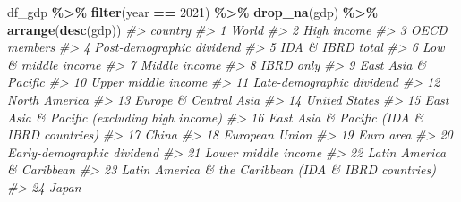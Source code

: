 \documentclass[
  xelatex, ja=standard]{bxjsbook}
\newenvironment{Shaded}{\begin{snugshade}}{\end{snugshade}}
\newcommand{\CommentTok}[1]{\textcolor[rgb]{0.56,0.35,0.01}{\textit{#1}}}
\newcommand{\DecValTok}[1]{\textcolor[rgb]{0.00,0.00,0.81}{#1}}
\newcommand{\FunctionTok}[1]{\textcolor[rgb]{0.13,0.29,0.53}{\textbf{#1}}}
\newcommand{\NormalTok}[1]{#1}
\newcommand{\SpecialCharTok}[1]{\textcolor[rgb]{0.81,0.36,0.00}{\textbf{#1}}}
\theoremstyle{definition}
\theoremstyle{definition}
\theoremstyle{definition}
\theoremstyle{definition}
\theoremstyle{remark}
\begin{document}
\begin{Shaded}
\begin{Highlighting}[]
\NormalTok{df\_gdp }\SpecialCharTok{\%\textgreater{}\%} \FunctionTok{filter}\NormalTok{(year }\SpecialCharTok{==} \DecValTok{2021}\NormalTok{) }\SpecialCharTok{\%\textgreater{}\%} \FunctionTok{drop\_na}\NormalTok{(gdp) }\SpecialCharTok{\%\textgreater{}\%} \FunctionTok{arrange}\NormalTok{(}\FunctionTok{desc}\NormalTok{(gdp))}
\CommentTok{\#\textgreater{}                                                  country}
\CommentTok{\#\textgreater{} 1                                                  World}
\CommentTok{\#\textgreater{} 2                                            High income}
\CommentTok{\#\textgreater{} 3                                           OECD members}
\CommentTok{\#\textgreater{} 4                              Post{-}demographic dividend}
\CommentTok{\#\textgreater{} 5                                       IDA \& IBRD total}
\CommentTok{\#\textgreater{} 6                                    Low \& middle income}
\CommentTok{\#\textgreater{} 7                                          Middle income}
\CommentTok{\#\textgreater{} 8                                              IBRD only}
\CommentTok{\#\textgreater{} 9                                    East Asia \& Pacific}
\CommentTok{\#\textgreater{} 10                                   Upper middle income}
\CommentTok{\#\textgreater{} 11                             Late{-}demographic dividend}
\CommentTok{\#\textgreater{} 12                                         North America}
\CommentTok{\#\textgreater{} 13                                 Europe \& Central Asia}
\CommentTok{\#\textgreater{} 14                                         United States}
\CommentTok{\#\textgreater{} 15           East Asia \& Pacific (excluding high income)}
\CommentTok{\#\textgreater{} 16            East Asia \& Pacific (IDA \& IBRD countries)}
\CommentTok{\#\textgreater{} 17                                                 China}
\CommentTok{\#\textgreater{} 18                                        European Union}
\CommentTok{\#\textgreater{} 19                                             Euro area}
\CommentTok{\#\textgreater{} 20                            Early{-}demographic dividend}
\CommentTok{\#\textgreater{} 21                                   Lower middle income}
\CommentTok{\#\textgreater{} 22                             Latin America \& Caribbean}
\CommentTok{\#\textgreater{} 23  Latin America \& the Caribbean (IDA \& IBRD countries)}
\CommentTok{\#\textgreater{} 24                                                 Japan}

\end{Highlighting}
\end{Shaded}
\end{document}
